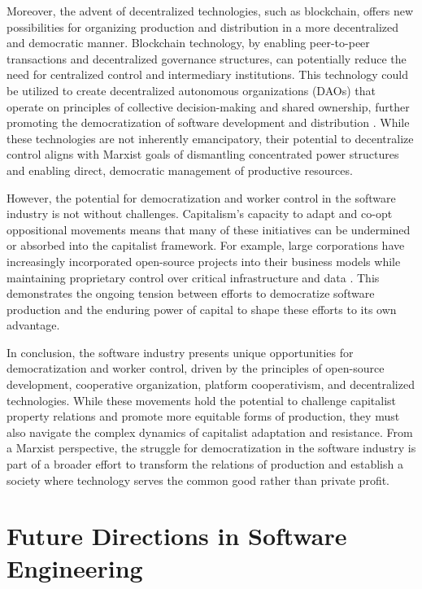 \begin{refsection}
Moreover, the advent of decentralized technologies, such as blockchain, offers new possibilities for organizing production and distribution in a more decentralized and democratic manner. Blockchain technology, by enabling peer-to-peer transactions and decentralized governance structures, can potentially reduce the need for centralized control and intermediary institutions. This technology could be utilized to create decentralized autonomous organizations (DAOs) that operate on principles of collective decision-making and shared ownership, further promoting the democratization of software development and distribution \cite[pp.~60-63]{tapscott2016blockchain}. While these technologies are not inherently emancipatory, their potential to decentralize control aligns with Marxist goals of dismantling concentrated power structures and enabling direct, democratic management of productive resources.

However, the potential for democratization and worker control in the software industry is not without challenges. Capitalism’s capacity to adapt and co-opt oppositional movements means that many of these initiatives can be undermined or absorbed into the capitalist framework. For example, large corporations have increasingly incorporated open-source projects into their business models while maintaining proprietary control over critical infrastructure and data \cite[pp.~71-73]{birkinbine2020incorporated}. This demonstrates the ongoing tension between efforts to democratize software production and the enduring power of capital to shape these efforts to its own advantage.

In conclusion, the software industry presents unique opportunities for democratization and worker control, driven by the principles of open-source development, cooperative organization, platform cooperativism, and decentralized technologies. While these movements hold the potential to challenge capitalist property relations and promote more equitable forms of production, they must also navigate the complex dynamics of capitalist adaptation and resistance. From a Marxist perspective, the struggle for democratization in the software industry is part of a broader effort to transform the relations of production and establish a society where technology serves the common good rather than private profit.

\section{Future Directions in Software Engineering}


\end{refsection}
